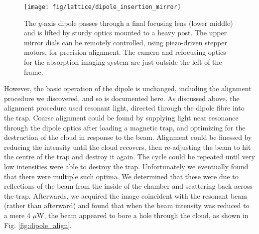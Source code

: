 	\begin{figure}
		\begin{minipage}{0.43\textwidth}
		\vspace{0cm}
		\caption{The $y$-axis dipole passes through a final focusing lens (lower middle) and is lifted by sturdy optics mounted to a heavy post.
	The upper mirror dials can be remotely controlled, using piezo-driven stepper motors, for precision alignment.
	The camera and refocusing optics for the absorption imaging system are just outside the left of the frame.}
		\label{fig:lifetime}
		\end{minipage}
		\hfill
		\begin{minipage}{0.55\textwidth}
		\vspace{0cm}
		\texttt{[image: fig/lattice/dipole\_insertion\_mirror]} %
		\end{minipage}
	\end{figure}


	
	However, the basic operation of the dipole is unchanged, including the alignment procedure we discovered, and so is documented here.
	As discussed above, the alignment procedure used resonant light, directed through the dipole fibre into the trap.
	Coarse alignment could be found by supplying light near resonance through the dipole optics after loading a magnetic trap, and optimizing for the destruction of the cloud in response to the beam.
	Alignment could be finessed by reducing the intensity until the cloud recovers, then re-adjusting the beam to hit the centre of the trap and destroy it again.
	The cycle could be repeated until very low intensities were able to destroy the trap.
	Unfortunately we eventually found that there were multiple such optima.
	We determined that these were due to reflections of the beam from the inside of the chamber and scattering back across the trap.
	Afterwards, we acquired the image coincident with the resonant beam (rather than afterward) and found that when the beam intensity was reduced to a mere 4 $\mu$W, the beam appeared to bore a hole through the cloud, as shown in Fig.	\ref{fig:dipole_align}.
	
